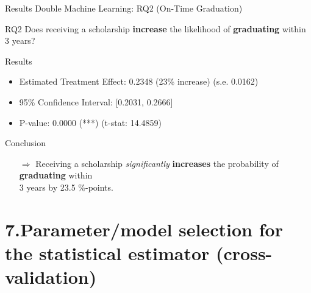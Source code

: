 \documentclass[aspectratio=169]{beamer}
\begin{document}
\begin{frame}{Results Double Machine Learning: RQ2 (On-Time Graduation)}
\vspace{20pt}
\begin{alertblock}{RQ2}
	Does receiving a scholarship \textbf{increase} the likelihood of \textbf{graduating} within 3 years?
\end{alertblock}

\begin{block}{Results}
\begin{itemize}[label=--,itemsep=1pt,topsep=2pt]
	\item Estimated Treatment Effect: 0.2348 (23\% increase) (s.e. 0.0162)
	\item 95\% Confidence Interval: [0.2031, 0.2666]
	\item P-value: 0.0000 (***) (t-stat: 14.4859)
\end{itemize}
\end{block}

\begin{exampleblock}{Conclusion}
\vspace{-3pt}
\begin{itemize}
	\item [$\Rightarrow$]Receiving a scholarship \textit{significantly} \textbf{increases} the probability of \textbf{graduating} within \\ 3 years by 23.5 \%-points.
\end{itemize}
\vspace{-3pt}
	
\end{exampleblock}

\end{frame}




\section{7.Parameter/model selection for the statistical estimator (cross-validation)}
\end{document}
